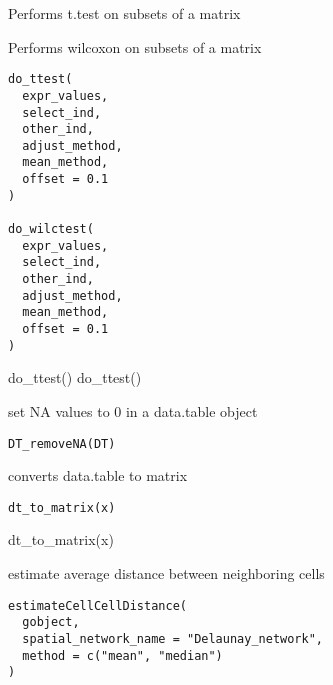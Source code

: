 \documentclass[a4paper]{book}
\begin{document}
%
\begin{Description}\relax
Performs t.test on subsets of a matrix

Performs wilcoxon on subsets of a matrix
\end{Description}
%
\begin{Usage}
\begin{verbatim}
do_ttest(
  expr_values,
  select_ind,
  other_ind,
  adjust_method,
  mean_method,
  offset = 0.1
)

do_wilctest(
  expr_values,
  select_ind,
  other_ind,
  adjust_method,
  mean_method,
  offset = 0.1
)
\end{verbatim}
\end{Usage}
%
\begin{Examples}
\begin{ExampleCode}
    do_ttest()
    do_ttest()
\end{ExampleCode}
\end{Examples}
%
\begin{Description}\relax
set NA values to 0 in a data.table object
\end{Description}
%
\begin{Usage}
\begin{verbatim}
DT_removeNA(DT)
\end{verbatim}
\end{Usage}
%
\begin{Description}\relax
converts data.table to matrix
\end{Description}
%
\begin{Usage}
\begin{verbatim}
dt_to_matrix(x)
\end{verbatim}
\end{Usage}
%
\begin{Examples}
\begin{ExampleCode}
    dt_to_matrix(x)
\end{ExampleCode}
\end{Examples}
%
\begin{Description}\relax
estimate average distance between neighboring cells
\end{Description}
%
\begin{Usage}
\begin{verbatim}
estimateCellCellDistance(
  gobject,
  spatial_network_name = "Delaunay_network",
  method = c("mean", "median")
)
\end{verbatim}
\end{Usage}
\end{document}
